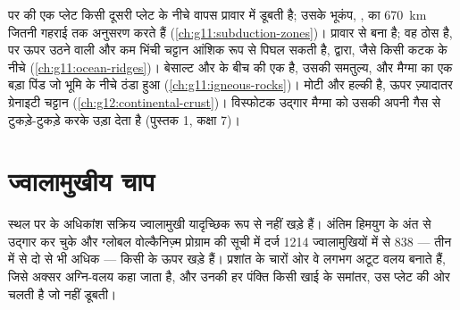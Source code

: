 \begin{recall}
 पर  की एक प्लेट किसी दूसरी प्लेट के नीचे वापस
प्रावार में डूबती है; उसके भूकंप, ,
 का \qty{670}{km} जितनी गहराई तक अनुसरण करते हैं
(\cref{ch:g11:subduction-zones})। प्रावार  से बना है; वह
ठोस है, पर ऊपर उठने वाली और कम भिंची चट्टान आंशिक रूप से पिघल सकती है,
 द्वारा, जैसे किसी कटक के नीचे (\cref{ch:g11:ocean-ridges})।
 बेसाल्ट और  के बीच की एक  है,  उसकी 
समतुल्य, और  मैग्मा का एक बड़ा पिंड जो भूमि के नीचे ठंडा हुआ
(\cref{ch:g11:igneous-rocks})।  मोटी और हल्की है,
ऊपर ज़्यादातर ग्रेनाइटी चट्टान (\cref{ch:g12:continental-crust})। विस्फोटक
उद्गार मैग्मा को उसकी अपनी गैस से टुकड़े-टुकड़े करके उड़ा देता है (पुस्तक 1, कक्षा 7)।
\end{recall}

\section{ज्वालामुखीय चाप}

स्थल पर के अधिकांश सक्रिय ज्वालामुखी यादृच्छिक रूप से नहीं खड़े हैं। अंतिम हिमयुग के अंत से
उद्गार कर चुके और ग्लोबल वोल्कैनिज़्म प्रोग्राम की सूची में दर्ज 1214
ज्वालामुखियों में से 838 --- तीन में से दो से भी अधिक --- किसी  के ऊपर
खड़े हैं। प्रशांत के चारों ओर वे लगभग अटूट वलय बनाते हैं, जिसे अक्सर
अग्नि-वलय कहा जाता है, और उनकी हर पंक्ति किसी खाई के समांतर,
उस प्लेट की ओर चलती है जो नहीं डूबती।

